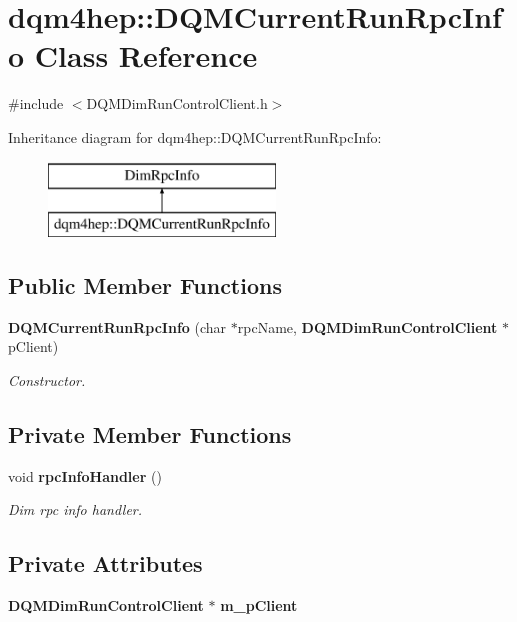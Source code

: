 \section{dqm4hep\+:\+:D\+Q\+M\+Current\+Run\+Rpc\+Info Class Reference}
\label{classdqm4hep_1_1DQMCurrentRunRpcInfo}


{\ttfamily \#include $<$D\+Q\+M\+Dim\+Run\+Control\+Client.\+h$>$}

Inheritance diagram for dqm4hep\+:\+:D\+Q\+M\+Current\+Run\+Rpc\+Info\+:\begin{figure}[H]
\begin{center}
\leavevmode
\includegraphics[height=2.000000cm]{classdqm4hep_1_1DQMCurrentRunRpcInfo}
\end{center}
\end{figure}
\subsection*{Public Member Functions}
\begin{DoxyCompactItemize}
\item 
{\bf D\+Q\+M\+Current\+Run\+Rpc\+Info} (char $\ast$rpc\+Name, {\bf D\+Q\+M\+Dim\+Run\+Control\+Client} $\ast$p\+Client)
\begin{DoxyCompactList}\small\item\em Constructor. \end{DoxyCompactList}\end{DoxyCompactItemize}
\subsection*{Private Member Functions}
\begin{DoxyCompactItemize}
\item 
void {\bf rpc\+Info\+Handler} ()
\begin{DoxyCompactList}\small\item\em Dim rpc info handler. \end{DoxyCompactList}\end{DoxyCompactItemize}
\subsection*{Private Attributes}
\begin{DoxyCompactItemize}
\item 
{\bf D\+Q\+M\+Dim\+Run\+Control\+Client} $\ast$ {\bf m\+\_\+p\+Client}
\end{DoxyCompactItemize}


